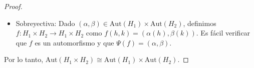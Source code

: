 \begin{proof}
\begin{itemize}
        \item Sobreyectiva: Dado $(\alpha, \beta) \in \text{Aut}(H_1) \times \text{Aut}(H_2)$, definimos $f: H_1 \times H_2 \to H_1 \times H_2$ como $f(h, k) = (\alpha(h), \beta(k))$.
        Es fácil verificar que $f$ es un automorfismo y que $\Psi(f) = (\alpha, \beta)$.
    \end{itemize}
    
    Por lo tanto, $\text{Aut}(H_1 \times H_2) \cong \text{Aut}(H_1) \times \text{Aut}(H_2)$.
\end{proof}


